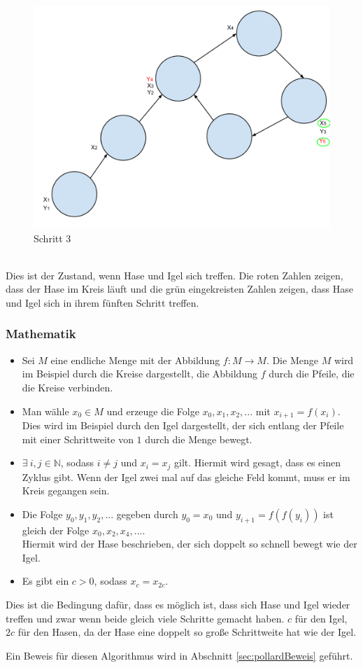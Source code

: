    \begin{figure}[!h] 
    	\centering
    	\includegraphics[width=0.7\linewidth]{Rho3}
    	\caption{Schritt 3}
    	\label{fig:Rho3)}
    \end{figure}
    \ \\
    Dies ist der Zustand, wenn Hase und Igel sich treffen. Die roten Zahlen zeigen, dass der Hase im Kreis l\"auft und die gr\"un eingekreisten Zahlen zeigen, dass Hase und Igel sich in ihrem f\"unften Schritt treffen. 

  \subsubsection{Mathematik}
  \begin{itemize}


  	\item Sei $M$ eine endliche Menge mit der Abbildung $f : M \rightarrow M$. Die Menge $M$ wird im Beispiel durch die Kreise dargestellt, die Abbildung $f$ durch die Pfeile, die die Kreise verbinden.
  	
  	\item Man w\"ahle $x_0 \in M$ und erzeuge die Folge $x_0, x_1, x_2,...$ mit $x_{i+1} = f(x_i)$. Dies wird im Beispiel durch den Igel dargestellt, der sich entlang der Pfeile mit einer Schrittweite von $1$ durch die Menge bewegt.
	
  	\item $\exists \ i,j \in \mathbb{N}$, sodass $i \not= j$ und $x_i = x_j$ gilt. Hiermit wird gesagt, dass es einen Zyklus gibt. Wenn der Igel zwei mal auf das gleiche Feld kommt, muss er im Kreis gegangen sein.
  	
  	\item Die Folge $y_0, y_1, y_2,...$ gegeben durch $y_0=x_0$ und $y_{i+1}=f(f(y_i))$ ist gleich der Folge $x_0,x_2,x_4,...$.\\
  Hiermit wird der Hase beschrieben, der sich doppelt so schnell bewegt wie der Igel. 
  	
  	\item Es gibt ein $c>0$, sodass $x_c=x_{2c}$.
  	 \end{itemize}
  	\noindent Dies ist die Bedingung daf\"ur, dass es m\"oglich ist, dass sich Hase und Igel wieder treffen und zwar wenn beide gleich viele Schritte gemacht haben. $c$ f\"ur den Igel, $2c$ f\"ur den Hasen, da der Hase eine doppelt so gro\ss e Schrittweite hat wie der Igel.
 
  
  Ein Beweis f\"ur diesen Algorithmus wird in Abschnitt \ref{sec:pollardBeweis} gef\"uhrt.